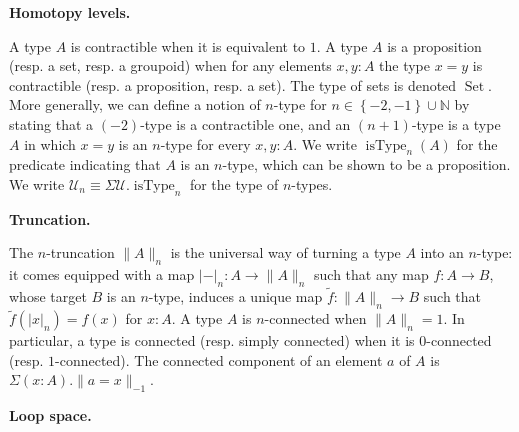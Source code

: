 \documentclass[10pt,a4paper]{article}
\begin{document}
 
 
 
\par\medskip\noindent\textbf{Homotopy levels.}\par
 
 
A type $A$ is contractible when it is equivalent to $1$. A type $A$ is a proposition (resp. a set, resp. a groupoid) when for any elements $x,y:A$ the type $x=y$ is contractible (resp. a proposition, resp. a set). The type of sets is denoted $\operatorname{Set}$. More generally, we can define a notion of $n$-type for $n\in\left\{-2,-1\right\}\cup\mathbb{N}$ by stating that a $(-2)$-type is a contractible one, and an $(n{+}1)$-type is a type $A$ in which $x=y$ is an $n$-type for every $x,y:A$. We write $\operatorname{isType}_{n}(A)$ for the predicate indicating that $A$ is an $n$-type, which can be shown to be a proposition. We write $\mathcal{U}_{n}\equiv\Sigma\mathcal{U}.\operatorname{isType}_{n}$ for the type of $n$-types.\par
 
 
 
 
\par\medskip\noindent\textbf{Truncation.}\par
 
 
The $n$-truncation $\|A\|_{n}$ is the universal way of turning a type $A$ into an $n$-type: it comes equipped with a map $|{-}|_{n}:A\to\|A\|_{n}$ such that any map $f:A\to B$, whose target $B$ is an $n$-type, induces a unique map $\tilde{f}:\|A\|_{n}\to B$ such that $\tilde{f}(|x|_{n})=f(x)$ for $x:A$. A type $A$ is $n$-connected when $\|A\|_{n}=1$. In particular, a type is connected (resp. simply connected) when it is $0$-connected (resp. $1$-connected). The connected component of an element $a$ of $A$ is $\Sigma(x:A).\|a=x\|_{-1}$.\par
 
 
 
 
\par\medskip\noindent\textbf{Loop space.}\par
 
\end{document}
